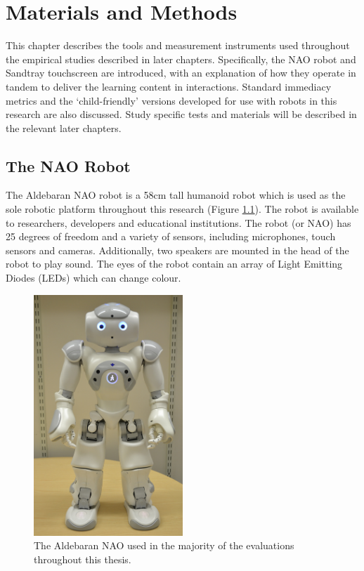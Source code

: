 \chapter{Materials and Methods}\label{chap:method}
This chapter describes the tools and measurement instruments used throughout the empirical studies described in later chapters. Specifically, the NAO robot and Sandtray touchscreen are introduced, with an explanation of how they operate in tandem to deliver the learning content in interactions. Standard \gls{immediacy} metrics and the `child-friendly' versions developed for use with robots in this research are also discussed. Study specific tests and materials will be described in the relevant later chapters.

\section{The NAO Robot}\label{sec:method-nao}
The Aldebaran NAO robot is a 58cm tall humanoid robot which is used as the sole robotic platform throughout this research (Figure \ref{fig:ch3_nao}). The robot is available to researchers, developers and educational institutions. The robot (or NAO) has 25 degrees of freedom and a variety of sensors, including microphones, touch sensors and cameras. Additionally, two speakers are mounted in the head of the robot to play sound. The eyes of the robot contain an array of Light Emitting Diodes (LEDs) which can change colour.

\begin{figure}[ht]
    \centering
    \includegraphics[width=0.5\textwidth]{images/ch3_nao.jpg}
    \caption{The Aldebaran NAO used in the majority of the evaluations throughout this thesis.}
    \label{fig:ch3_nao}
\end{figure}

